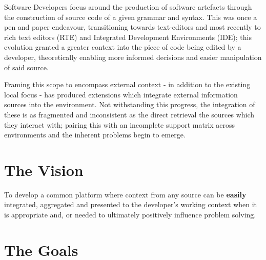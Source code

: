 Software Developers focus around the production of software artefacts through the construction of source code of a given grammar and syntax. This was once a pen and paper endeavour, transitioning towards text-editors and most recently to rich text editors (RTE) and Integrated Development Environments (IDE); this evolution granted a greater context into the piece of code being edited by a developer, theoretically enabling more informed decisions and easier manipulation of said source.

Framing this scope to encompass external context - in addition to the existing local focus - has produced extensions which integrate external information sources into the environment. Not withstanding this progress, the integration of these is as fragmented and inconsistent as the direct retrieval the sources which they interact with; pairing this with an incomplete support matrix across environments and the inherent problems begin to emerge.


\section{The Vision}

To develop a common platform where context from any source can be \textbf{easily} integrated, aggregated and presented to the developer's working context when it is appropriate and, or needed to ultimately positively influence problem solving. 

\section{The Goals}

